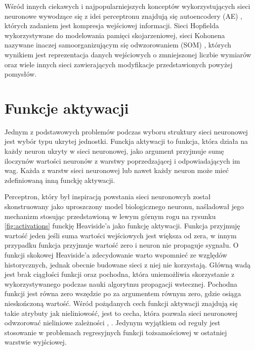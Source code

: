 \documentclass[11pt]{book}
\theoremstyle{definition}
\begin{document}
Wśród innych ciekawych i najpopularniejszych konceptów wykorzystujących sieci neuronowe wywodzące się z idei perceptronu znajdują się autoencodery (AE) \cite{1988Autoencoders}, których zadaniem jest kompresja wejściowej informacji. Sieci Hopfielda \cite{hopfield-neural-networks-and-1982} wykorzystywane do modelowania pamięci skojarzeniowej, sieci Kohonena nazywane inaczej samoorganizującym się odwzorowaniem (SOM) \cite{Kohonen1982}, których wynikiem jest reprezentacja danych wejściowych o zmniejszonej liczbie wymiarów oraz wiele innych sieci zawierających modyfikacje przedstawionych powyżej pomysłów.


\section{Funkcje aktywacji}
\label{activation}
Jednym z podstawowych problemów podczas wyboru struktury sieci neuronowej jest wybór typu ukrytej jednostki. Funckja aktywacji to funkcja, która działa na każdy neuron ukryty w sieci neuronowej, jako argument przyjmuje sumę iloczynów wartości neuronów z warstwy poprzedzającej i odpowiadających im wag. Każda z warstw sieci  neuronowej lub nawet każdy neuron może mieć zdefiniowaną inną funckję aktywacji.

Perceptron, który był inspiracją powstania sieci neuronowcyh został skonstruowany jako uproszczony model biologicznego neuronu, naśladował jego mechanizm stosując przedstawioną w lewym górnym rogu na rysunku \ref{fig:activations} funckję Heaviside'a jako funkcję aktywacji. Funkcja przyjmuję wartość jeden jeśli suma wartości wejściowych jest większa od zera, w innym przypadku funkcja przyjmuje wartość zero i neuron nie propaguje sygnału. O funkcji skokowej Heaviside'a zdecydowanie warto wspomnieć ze względów historycznych, jednak obecnie budowane sieci z niej nie korzystają. Główną wadą jest brak ciągłości funkcji oraz pochodna, która uniemożliwia skorzystanie z wykorzystywanego podczas nauki algorytmu propagacji wstecznej\cite{1986Natur.323..533R}. Pochodna funkcji jest równa zero wszędzie po za argumentem równym zero, gdzie osiąga nieskończoną wartość. Wśród pożądanych cech funkcji aktywacji znajdują się takie atrybuty jak nieliniowość, jest to cecha, która pozwala sieci neuronowej odwzorować nieliniowe zależności \cite{LeCun:1998:EB:645754.668382}, \cite{Hornik1989}. Jedynym wyjątkiem od reguły jest stosowanie w problemach regresyjnych funkcji tożsamościowej w ostatniej warstwie wyjściowej. 
\end{document}

